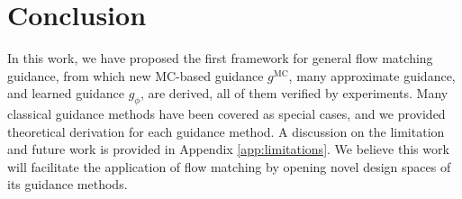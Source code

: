 \section{Conclusion}
In this work, we have proposed the first framework for general flow matching guidance, from which new MC-based guidance $g^{\text{MC}}$, many approximate guidance, and learned guidance $g_\phi$, are derived, all of them verified by experiments. Many classical guidance methods have been covered as special cases, and we provided theoretical derivation for each guidance method. A discussion on the limitation and future work is provided in Appendix \ref{app:limitations}. We believe this work will facilitate the application of flow matching by opening novel design spaces of its guidance methods.
